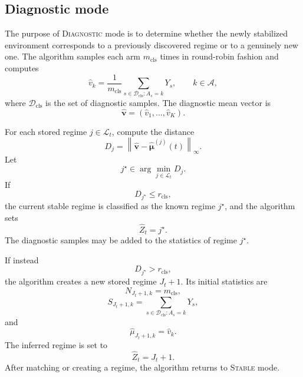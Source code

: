 \documentclass[11pt]{article}
\newcommand{\A}{\mathcal A}
\newcommand{\norm}[1]{\left\lVert #1 \right\rVert}
\begin{document}
\subsection{Diagnostic mode}
\label{subsec:diagnostic_mode}

The purpose of \textsc{Diagnostic} mode is to determine whether the newly stabilized environment corresponds to a previously discovered regime or to a genuinely new one. The algorithm samples each arm $m_{\mathrm{cls}}$ times in round-robin fashion and computes
\begin{equation}
\label{eq:diagnostic_arm_mean}
\widehat v_k
=
\frac{1}{m_{\mathrm{cls}}}
\sum_{s\in\mathcal D_{\mathrm{cls}}: A_s=k}Y_s,
\qquad
k\in\A,
\end{equation}
where $\mathcal D_{\mathrm{cls}}$ is the set of diagnostic samples. The diagnostic mean vector is
\begin{equation}
\label{eq:diagnostic_vector}
\widehat{\bm v}
=
(\widehat v_1,\ldots,\widehat v_K).
\end{equation}

For each stored regime $j\in\mathcal L_t$, compute the distance
\begin{equation}
\label{eq:matching_distance}
D_j
=
\norm{\widehat{\bm v}-\widehat{\bm\mu}^{(j)}(t)}_{\infty}.
\end{equation}
Let
\begin{equation}
\label{eq:closest_regime}
j^\star
\in
\arg\min_{j\in\mathcal L_t}D_j.
\end{equation}
If
\begin{equation}
\label{eq:matched_regime_condition}
D_{j^\star}\leq r_{\mathrm{cls}},
\end{equation}
the current stable regime is classified as the known regime $j^\star$, and the algorithm sets
\begin{equation}
\label{eq:set_matched_regime}
\widehat Z_t=j^\star.
\end{equation}
The diagnostic samples may be added to the statistics of regime $j^\star$.

If instead
\begin{equation}
\label{eq:new_regime_condition}
D_{j^\star}>r_{\mathrm{cls}},
\end{equation}
the algorithm creates a new stored regime $J_t+1$. Its initial statistics are
\begin{equation}
\label{eq:new_regime_count}
N_{J_t+1,k}=m_{\mathrm{cls}},
\end{equation}
\begin{equation}
\label{eq:new_regime_sum}
S_{J_t+1,k}
=
\sum_{s\in\mathcal D_{\mathrm{cls}}:A_s=k}Y_s,
\end{equation}
and
\begin{equation}
\label{eq:new_regime_mean}
\widehat\mu_{J_t+1,k}
=
\widehat v_k.
\end{equation}
The inferred regime is set to
\begin{equation}
\label{eq:set_new_regime}
\widehat Z_t=J_t+1.
\end{equation}
After matching or creating a regime, the algorithm returns to \textsc{Stable} mode.
\end{document}

